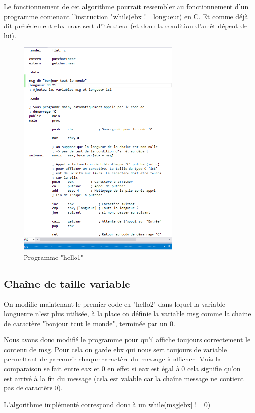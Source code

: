 \documentclass[11pt]{report}
\begin{document}
Le fonctionnement de cet algorithme pourrait ressembler au fonctionnement d'un programme contenant l'instruction "while(ebx != longueur) en C. Et comme déjà dit précédement ebx nous sert d'itérateur (et donc la condition d'arrêt dépent de lui). 


\begin{figure}[h]
\includegraphics[width=8cm]{Capture5.PNG}
\caption{Programme "hello1"}
\end{figure}

\subsection{Chaîne de taille variable}

On modifie maintenant le premier code en "hello2" dans lequel la variable longueure n'est plus utilisée, à la place on définie la variable msg comme la chaine de caractère "bonjour tout le monde", terminée par un 0. 

Nous avons donc modifié le programme pour qu'il affiche toujours correctement le contenu de msg. Pour cela on garde ebx qui nous sert toujours de variable permettant de parcourir chaque caractère du message à afficher. Mais la comparaison se fait entre eax et 0 en effet si eax est égal à 0 cela signifie qu'on est arrivé à la fin du message (cela est valable car la chaîne message ne contient pas de caractère 0). 

L'algorithme implémenté correspond donc à un while(msg[ebx] != 0)
\end{document}
